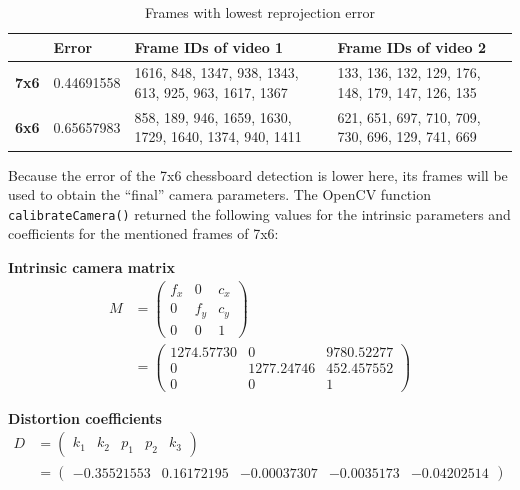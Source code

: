 \begin{table}[h]
    \centering
    \begin{tabular}{|l|l|l|l|}
        \hline
                     & \textbf{Error}     & \textbf{Frame IDs of video 1}                          & \textbf{Frame IDs of video 2}                    \\ \hline
        \textbf{7x6} & 0.44691558 & \parbox{5cm}{1616, 848, 1347, 938, 1343, 613, 925, 963, 1617, 1367}  & \parbox{5cm}{133, 136, 132, 129, 176, 148, 179, 147, 126, 135} \\ \hline
        \textbf{6x6} & 0.65657983 & \parbox{5cm}{858, 189, 946, 1659, 1630, 1729, 1640, 1374, 940, 1411} & \parbox{5cm}{621, 651, 697, 710, 709, 730, 696, 129, 741, 669} \\ \hline
        \end{tabular}
    \caption{Frames with lowest reprojection error}
    \label{tbl:errors}
\end{table}

Because the error of the 7x6 chessboard detection is lower here, its frames will be used to obtain the \enquote{final} camera parameters. The OpenCV function \texttt{calibrateCamera()} returned the following values for the intrinsic parameters and coefficients for the mentioned frames of 7x6:

\textbf{Intrinsic camera matrix}
\begin{equation} \label{eq1}
    \begin{split}
        M & =
        \begin{pmatrix} f_x & 0 & c_x \\ 0 & f_y & c_y \\ 0 & 0 & 1 \end{pmatrix} \\
         & =
        \begin{pmatrix}
            1274.57730 & 0 & 9780.52277\\
            0 & 1277.24746 & 452.457552\\
            0 & 0 & 1
        \end{pmatrix}
    \end{split}
\end{equation}

\textbf{Distortion coefficients}
\begin{equation} \label{eq2}
    \begin{split}
        D & =
        \begin{pmatrix}
            k_1 & k_2 & p_1 & p_2 & k_3
        \end{pmatrix} \\
        & =
        \begin{pmatrix}
            -0.35521553 & 0.16172195 & -0.00037307 & -0.0035173  & -0.04202514
        \end{pmatrix}
    \end{split}
\end{equation}

